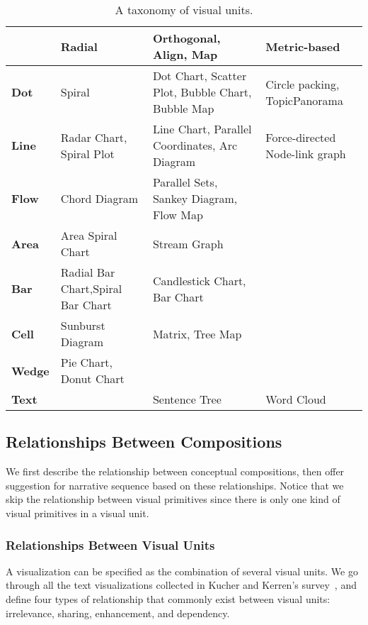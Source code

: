 \begin{table}[tb]
  \caption{A taxonomy of visual units.}
  \label{tab:unit}
  \small
  \centering
  \begin{tabular}{p{1.2cm}|p{1.6cm}|p{1.6cm}|p{1.6cm}}
  \toprule
 \textbf{} &\textbf{Radial} &\textbf{Orthogonal, Align, Map} &\textbf{Metric-based}   \\ 
  \midrule
  \textbf{Dot} &Spiral&Dot Chart, Scatter Plot, Bubble Chart, Bubble Map &Circle packing, TopicPanorama\cite{7042494}\\
  \midrule
  \textbf{Line}&  Radar Chart, Spiral Plot    &Line Chart, Parallel Coordinates, Arc Diagram &  Force-directed Node-link graph   \\ 
  \midrule
   \textbf{Flow}&  Chord Diagram   &Parallel Sets, Sankey Diagram, 
   Flow Map  & \\
  \midrule
  \textbf{Area}&  Area Spiral Chart &Stream Graph &  \\ 
  \midrule
  \textbf{Bar}&      Radial Bar Chart,Spiral Bar Chart  & Candlestick Chart, Bar Chart  &   \\
  \midrule
  \textbf{Cell}& Sunburst Diagram  &Matrix, Tree Map &  \\
  \midrule
  \textbf{Wedge}& Pie Chart, Donut Chart &  &  \\
  \midrule
  \textbf{Text}&    &  Sentence Tree  & Word Cloud \\
  \bottomrule
  
  \end{tabular}
  \vspace{1mm}
\end{table}

\subsection{Relationships Between Compositions}\label{relationship}
We first describe the relationship between conceptual compositions, then offer suggestion for narrative sequence based on these relationships. Notice that we skip the relationship between visual primitives since there is only one kind of visual primitives in a visual unit. 
\subsubsection{Relationships Between Visual Units}
A visualization can be specified as the combination of several visual units. 
We go through all the text visualizations collected in Kucher and Kerren's survey~\cite{kucher2015text}, and define four types of relationship that commonly exist between visual units: irrelevance, sharing, enhancement, and dependency. 

